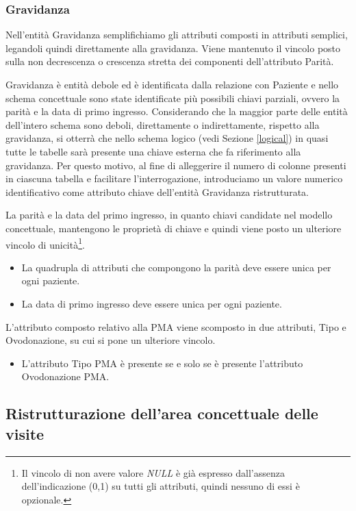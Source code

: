 \subsubsection{Gravidanza}

Nell'entità Gravidanza semplifichiamo gli attributi composti in attributi semplici, legandoli quindi direttamente alla gravidanza.
Viene mantenuto il vincolo posto sulla non decrescenza o crescenza stretta dei componenti dell'attributo Parità.

Gravidanza è entità debole ed è identificata dalla relazione con Paziente e nello schema concettuale sono state identificate più possibili chiavi parziali, ovvero la parità e la data di primo ingresso.
Considerando che la maggior parte delle entità dell'intero schema sono deboli, direttamente o indirettamente, rispetto alla gravidanza, si otterrà che nello schema logico (vedi Sezione \ref{logical}) in quasi tutte le tabelle sarà presente una chiave esterna che fa riferimento alla gravidanza.
Per questo motivo, al fine di alleggerire il numero di colonne presenti in ciascuna tabella e facilitare l'interrogazione, introduciamo un valore numerico identificativo come attributo chiave dell'entità Gravidanza ristrutturata.

La parità e la data del primo ingresso, in quanto chiavi candidate nel modello concettuale, mantengono le proprietà di chiave e quindi viene posto un ulteriore vincolo di unicità\footnote{
    Il vincolo di non avere valore \emph{NULL} è già espresso dall'assenza dell'indicazione (0,1) su tutti gli attributi, quindi nessuno di essi è opzionale.
}.
\begin{itemize}
\item[\Con{}] La quadrupla di attributi che compongono la parità deve essere unica per ogni paziente.
\item[\Con{}] La data di primo ingresso deve essere unica per ogni paziente.
\end{itemize}

L'attributo composto relativo alla PMA viene scomposto in due attributi, Tipo e Ovodonazione, su cui si pone un ulteriore vincolo.
\begin{itemize}
\item[\Con{}] L'attributo Tipo PMA è presente se e solo se è presente l'attributo Ovodonazione PMA.
\end{itemize}

\subsection{Ristrutturazione dell'area concettuale delle visite}

